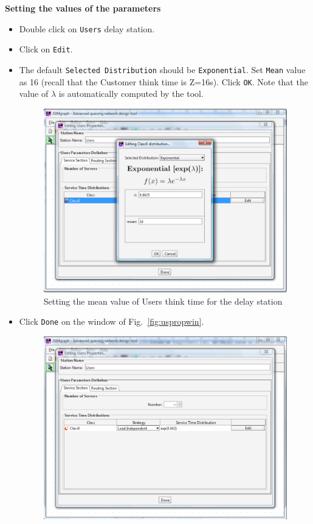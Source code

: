 \noindent \textbf{Setting the values of the parameters}
\begin{itemize} \item
Double click on \texttt{Users} delay station. \item  Click on
\texttt{Edit}. \item The default \texttt{Selected Distribution}
should be \texttt{Exponential}. Set \texttt{Mean} value as 16
(recall that the Customer think time is Z=16s). Click \texttt{OK}.
Note that the value of $\lambda$ is automatically computed by the
tool.

\begin{figure}[htb]
    \begin{center}
        \includegraphics[scale=.5]{img/jsimg/12.3.eps}
    \end{center}
    \caption{Setting the mean value of Users think time for the delay station}
    \label{fig:meanthin}
\end{figure}
\item Click \texttt{Done} on the window of
Fig.~\ref{fig:uspropwin}.
\begin{figure}[htb]
    \begin{center}
        \includegraphics[scale=.5]{img/jsimg/12.4.eps}

\end{center}
\end{figure}
\end{itemize}
